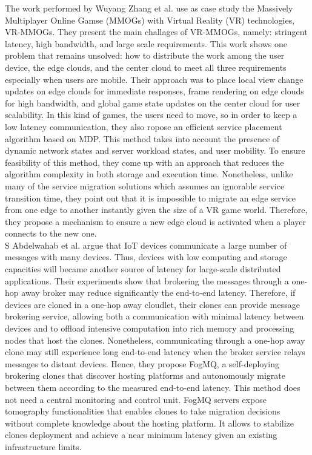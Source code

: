 \noindent\tab The work performed by Wuyang Zhang et al. \cite{Zhang2017} use as case study the Massively Multiplayer Online Gamse (MMOGs) with Virtual Reality (VR) technologies, VR-MMOGs. They present the main challages of VR-MMOGs, namely: stringent latency, high bandwidth, and large scale requirements. This work shows one problem that remains unsolved: how to distribute the work among the user device, the edge clouds, and the center cloud to meet all three requirements especially when users are mobile. Their approach was to place local view change updates on edge clouds for immediate responses, frame rendering on edge clouds for high bandwidth, and global game state updates on the center cloud for user scalability. In this kind of games, the users need to move, so in order to keep a low latency communication, they also ropose an efficient service placement algorithm based on MDP. This method takes into account the presence of dynamic network states and server workload states, and user mobility. To ensure feasibility of this method, they come up with an approach that reduces the algorithm complexity in both storage and execution time. Nonetheless, unlike many of the service migration solutions which assumes an ignorable service transition time, they point out that it is impossible to migrate an edge service from one edge to another instantly given the size of a VR game world. Therefore, they propose a mechanism to ensure a new edge cloud is activated when a player connects to the new one.\\

\noindent\tab S Abdelwahab et al. \cite{abdelwahab2018clones} argue that IoT devices communicate a large number of messages with many devices. Thus, devices with low computing and storage capacities will became another source of latency for large-scale distributed applications. Their experiments show that brokering the messages through a one-hop away broker may reduce significantly the end-to-end latency. Therefore, if devices are cloned in a one-hop away cloudlet, their clones can provide message brokering service, allowing both a communication with minimal latency between devices and to offload intensive computation into rich memory and processing nodes that host the clones. Nonetheless, communicating through a one-hop away clone may still experience long end-to-end latency when the broker service relays messages to distant devices. Hence, they propose FogMQ, a self-deploying brokering clones that discover hosting platforms and autonomously migrate between them according to the measured end-to-end latency. This method does not need a central monitoring and control unit. FogMQ servers expose tomography functionalities that enables clones to take migration decisions without complete knowledge about the hosting platform. It allows to stabilize clones deployment and achieve a near minimum latency given an existing infrastructure limits.\\


